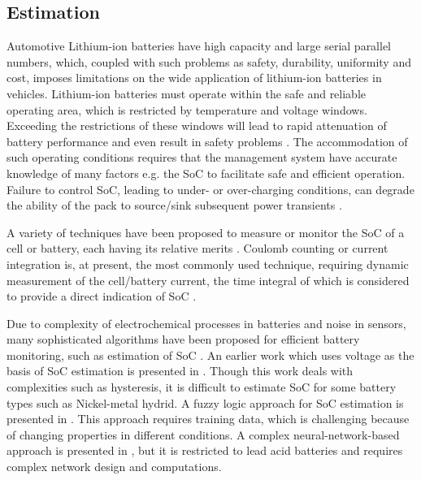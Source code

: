 \subsection{Estimation}

Automotive Lithium-ion batteries have high capacity and large serial parallel
numbers, which, coupled with such problems as safety,
durability, uniformity and cost, imposes limitations on the wide
application of lithium-ion batteries in vehicles. Lithium-ion
batteries must operate within the safe and reliable operating area, which is restricted by temperature and voltage windows. Exceeding the restrictions of these windows will lead to rapid
attenuation of battery performance and even result in safety
problems \cite{ZS_lu}. The accommodation
of such operating conditions requires that the management system have accurate knowledge of  many factors e.g. the  SoC to facilitate safe and efficient operation.
Failure to control SoC, leading to under- or over-charging
conditions, can degrade the ability of the pack to source/sink
subsequent power transients \cite{ZS_bha}.

A variety of techniques have been proposed to measure or
monitor the SoC of a cell or battery, each having its relative
merits \cite{ZS_pil}. Coulomb counting or current
integration is, at present, the most commonly used technique,
requiring dynamic measurement of the cell/battery current,
the time integral of which is considered to provide a direct
indication of SoC \cite{ZS_cau}. 

 Due to complexity of electrochemical processes in batteries and noise in sensors, many sophisticated algorithms have been proposed for efficient battery monitoring, such as estimation of SoC \cite{ZS_cun}. An  earlier  work  which  uses  voltage  as  the  basis  of  SoC estimation is presented in \cite{ZS_ver}. Though this work deals with complexities  such  as  hysteresis,  it  is difficult to estimate SoC for some battery types such as Nickel-metal  hydrid.  A  fuzzy  logic  approach  for  SoC  estimation is  presented  in \cite{ZS_sin}. This approach  requires  training  data, which is  challenging  because  of  changing  properties  in  different conditions.  A  complex  neural-network-based  approach  is presented in \cite{ZS_ang}, but it is restricted to lead acid batteries and requires complex network design and computations. 
 
